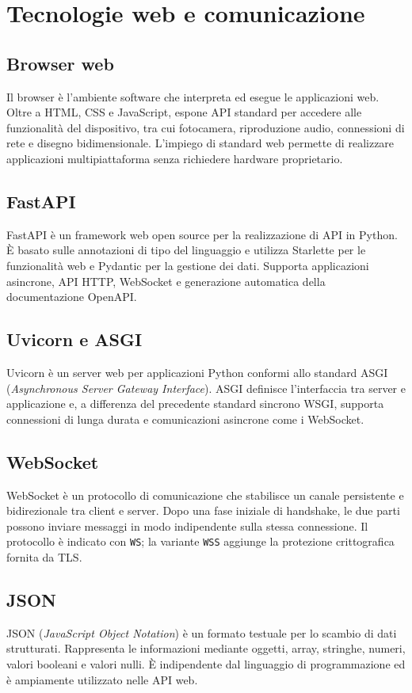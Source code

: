 \section{Tecnologie web e comunicazione}

\subsection{Browser web}
Il browser è l'ambiente software che interpreta ed esegue le applicazioni web.
Oltre a HTML, CSS e JavaScript, espone API standard per accedere alle
funzionalità del dispositivo, tra cui fotocamera, riproduzione audio,
connessioni di rete e disegno bidimensionale. L'impiego di standard web
permette di realizzare applicazioni multipiattaforma senza richiedere hardware
proprietario.

\subsection{FastAPI}
FastAPI è un framework web open source per la realizzazione di API in Python.
È basato sulle annotazioni di tipo del linguaggio e utilizza Starlette per le
funzionalità web e Pydantic per la gestione dei dati. Supporta applicazioni
asincrone, API HTTP, WebSocket e generazione automatica della documentazione
OpenAPI.

\subsection{Uvicorn e ASGI}
Uvicorn è un server web per applicazioni Python conformi allo standard ASGI
(\textit{Asynchronous Server Gateway Interface}). ASGI definisce l'interfaccia
tra server e applicazione e, a differenza del precedente standard sincrono
WSGI, supporta connessioni di lunga durata e comunicazioni asincrone come i
WebSocket.

\subsection{WebSocket}
WebSocket è un protocollo di comunicazione che stabilisce un canale persistente
e bidirezionale tra client e server. Dopo una fase iniziale di handshake, le
due parti possono inviare messaggi in modo indipendente sulla stessa
connessione. Il protocollo è indicato con \texttt{WS}; la variante
\texttt{WSS} aggiunge la protezione crittografica fornita da TLS.

\subsection{JSON}
JSON (\textit{JavaScript Object Notation}) è un formato testuale per lo scambio
di dati strutturati. Rappresenta le informazioni mediante oggetti, array,
stringhe, numeri, valori booleani e valori nulli. È indipendente dal linguaggio
di programmazione ed è ampiamente utilizzato nelle API web.

